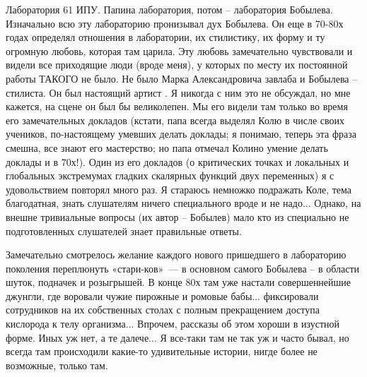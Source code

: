 Лаборатория 61 ИПУ. Папина лаборатория, потом – лаборатория Бобылева. Изначально всю эту лабораторию пронизывал дух Бобылева. Он еще в 70-80х годах определял отношения в лаборатории, их стилистику, их форму и ту огромную любовь, которая там царила. Эту любовь замечательно чувствовали и видели все приходящие люди (вроде меня), у которых по месту их постоянной работы ТАКОГО не было. Не было Марка Александровича завлаба и Бобылева – стилиста. Он был настоящий артист . Я никогда с ним это не обсуждал, но мне кажется, на сцене он был бы великолепен. Мы его видели там только во время его замечательных докладов (кстати, папа всегда выделял Колю в числе своих учеников, по-настоящему умевших делать доклады; я понимаю, теперь эта фраза смешна, все знают его мастерство; но папа отмечал Колино умение делать доклады и в 70х!). Один из его докладов (о критических точках и локальных и глобальных экстремумах гладких скалярных функций двух переменных) я с удовольствием повторял много раз.  Я стараюсь немножко подражать Коле, тема благодатная, знать слушателям ничего специального вроде и не надо... Однако, на внешне тривиальные вопросы (их автор – Бобылев) мало кто из специально не подготовленных слушателей знает правильные ответы.

Замечательно смотрелось желание каждого нового пришедшего в лабораторию поколения переплюнуть
«стари-\linebreak ков»~---
в основном самого Бобылева – в области шуток, подначек и розыгрышей.
В конце 80х там уже настали совершеннейшие джунгли, где воровали чужие пирожные и ромовые бабы...
фиксировали сотрудников на их собственных столах с полным прекращением доступа кислорода к телу организма...
Впрочем, рассказы об этом хороши в изустной форме. Иных уж нет, а те далече...
Я все-таки там не так уж и часто бывал, но всегда там происходили какие-то удивительные истории,
нигде более не возможные, только там.

